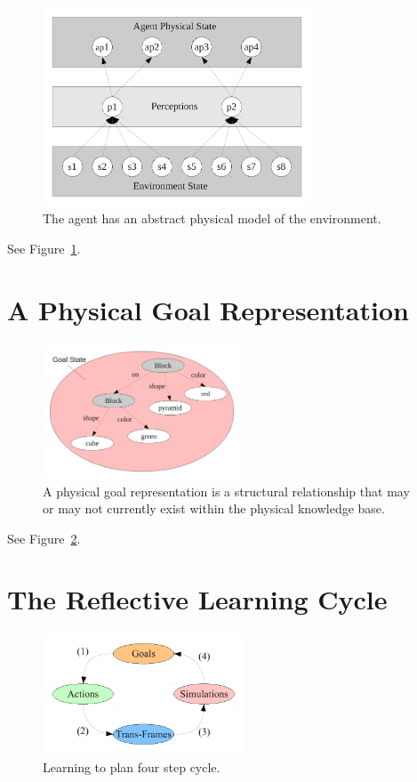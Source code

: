 \begin{figure}[bth]
  \center
  \includegraphics[width=8cm]{gfx/environment_perception_physical}
  \caption[The agent has an abstract physical model of the
    environment]{The agent has an abstract physical model of the
    environment.}
  \label{fig:environment_perception_physical}
\end{figure}

See Figure~\ref{fig:environment_perception_physical}.


\section{A Physical Goal Representation}

\begin{figure}[bth]
  \center
  \includegraphics[height=4cm]{gfx/goal_state}
  \caption[A physical goal representation]{A physical goal
    representation is a structural relationship that may or may not
    currently exist within the physical knowledge base.}
  \label{fig:goal_state}
\end{figure}

See Figure~\ref{fig:goal_state}.


\section{The Reflective Learning Cycle}

\begin{figure}[bth]
  \center
  \includegraphics[width=6cm]{gfx/learning_to_plan-four_step_cycle}
  \caption[Learning to plan four step cycle]{Learning to plan four step cycle.}
  \label{fig:learning_to_plan-four_step_cycle}
\end{figure}

